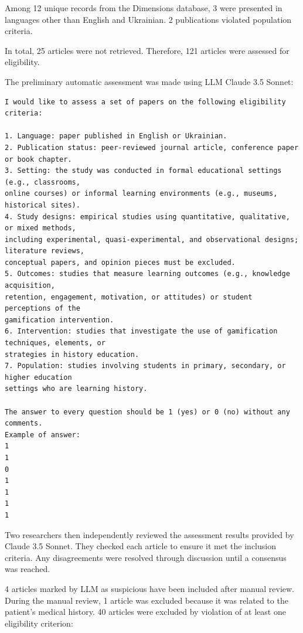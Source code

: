 \documentclass[a4paper,fleqn]{cas-sc}
\begin{document}
Among 12 unique records from the Dimensions database, 3 were presented in languages other than English and Ukrainian. 2 publications violated population criteria.

In total, 25 articles were not retrieved. Therefore, 121 articles were assessed for eligibility.

The preliminary automatic assessment was made using LLM Claude 3.5 Sonnet:

\begin{verbatim}
I would like to assess a set of papers on the following eligibility criteria:

1. Language: paper published in English or Ukrainian.
2. Publication status: peer-reviewed journal article, conference paper or book chapter. 
3. Setting: the study was conducted in formal educational settings (e.g., classrooms, 
online courses) or informal learning environments (e.g., museums, historical sites).
4. Study designs: empirical studies using quantitative, qualitative, or mixed methods, 
including experimental, quasi-experimental, and observational designs; literature reviews, 
conceptual papers, and opinion pieces must be excluded.
5. Outcomes: studies that measure learning outcomes (e.g., knowledge acquisition, 
retention, engagement, motivation, or attitudes) or student perceptions of the 
gamification intervention.
6. Intervention: studies that investigate the use of gamification techniques, elements, or 
strategies in history education.
7. Population: studies involving students in primary, secondary, or higher education 
settings who are learning history.

The answer to every question should be 1 (yes) or 0 (no) without any comments. 
Example of answer:
1
1
0
1
1
1
1
\end{verbatim}

Two researchers then independently reviewed the assessment results provided by Claude 3.5 Sonnet. They checked each article to ensure it met the inclusion criteria. Any disagreements were resolved through discussion until a consensus was reached.

4 articles marked by LLM as suspicious have been included after manual review. During the manual review, 1 article was excluded because it was related to the patient's medical history. 40 articles were excluded by violation of at least one eligibility criterion:
\end{document}
